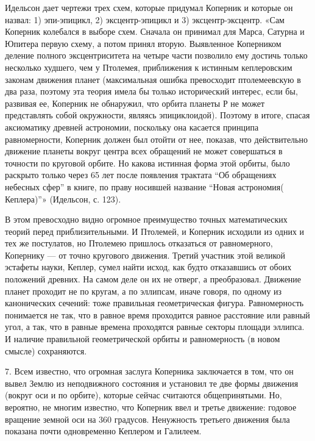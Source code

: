 Идельсон дает чертежи трех схем, которые придумал Коперник и которые
он назвал: 1) эпи-эпицикл, 2) эксцентр-эпицикл и 3) эксцентр-эксцентр.
«Сам Коперник колебался в выборе схем. Сначала он принимал для Марса,
Сатурна и Юпитера первую схему, а потом принял вторую. Выявленное
Коперником деление полного эксцентриситета на четыре части позволило
ему достичь только несколько худшего, чем у Птолемея, приближения к
истинным кеплеровским законам движения планет (максимальная ошибка
превосходит птолемеевскую в два раза, поэтому эта теория имела бы
только исторический интерес, если бы, развивая ее, Коперник не
обнаружил, что орбита планеты Р не может представлять собой
окружности, являясь эпициклоидой). Поэтому в итоге, спасая аксиоматику
древней астрономии, поскольку она касается принципа равномерности,
Коперник должен был отойти от нее, показав, что действительно движение
планеты вокруг центра всех обращений не может совершаться в точности
по круговой орбите. Но какова истинная форма этой орбиты, было
раскрыто только через 65 лет после появления трактата ``Об обращениях
небесных сфер'' в книге, по праву носившей название ``Новая
астрономия( Кеплера)''» (Идельсон, с. 123).

В этом превосходно видно огромное преимущество точных математических
теорий перед приблизительными. И Птолемей, и Коперник исходили из
одних и тех же постулатов, но Птолемею пришлось отказаться от
равномерного, Копернику --- от точно кругового движения. Третий
участник этой великой эстафеты науки, Кеплер, сумел найти исход, как
будто отказавшись от обоих положений древних. На самом деле он их не
отверг, а преобразовал. Движение планет проходит не по кругам, а по
эллипсам, иначе говоря, по одному из канонических сечений: тоже
правильная геометрическая фигура. Равномерность понимается не так, что
в равное время проходится равное расстояние или равный угол, а так,
что в равные времена проходятся равные секторы площади эллипса. И
наличие правильной геометрической орбиты и равномерность (в новом
смысле) сохраняются.

7. Всем известно, что огромная заслуга Коперника заключается в том,
что он вывел Землю из неподвижного состояния и установил те две формы
движения (вокруг оси и по орбите), которые сейчас считаются
общепринятыми. Но, вероятно, не многим известно, что Коперник ввел и
третье движение: годовое вращение земной оси на 360 градусов.
Ненужность третьего движения была показана почти одновременно Кеплером
и Галилеем.

